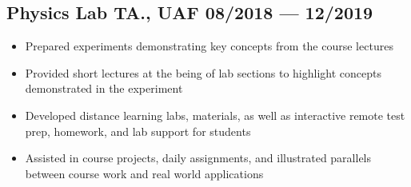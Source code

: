 \documentclass[letterpaper,11pt]{article}
\begin{document}
\subsection*{{\color{cvblue} Physics Lab TA., UAF } \hfill 08/2018 --- 12/2019} 
    \begin{itemize}
\item Prepared experiments demonstrating key concepts from the course lectures
\item Provided short lectures at the being of lab sections to highlight concepts demonstrated in the experiment
\item Developed distance learning labs, materials, as well as interactive remote test prep, homework, and lab support for students
 \item Assisted in course projects, daily assignments, and illustrated parallels between course work and real world applications
    \end{itemize}


\end{document}

